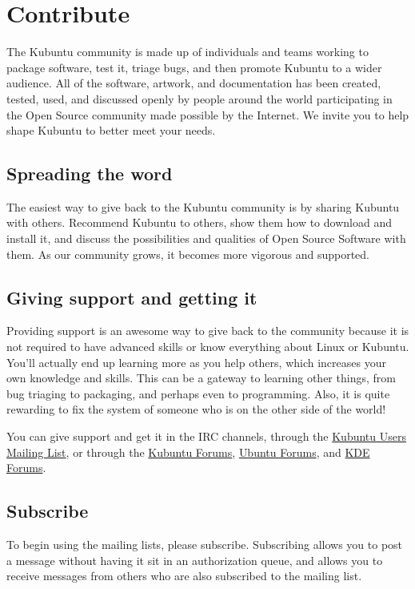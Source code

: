 \documentclass[letterpaper,10pt,english]{sphinxmanual}
\begin{document}
\chapter{Contribute}
\label{\detokenize{docs/contribute:contribute}}\label{\detokenize{docs/contribute::doc}}\label{\detokenize{docs/contribute:contribute-link}}
The Kubuntu community is made up of individuals and teams working to package software, test it, triage bugs, and then promote Kubuntu to a wider audience. All of the software, artwork, and documentation has been created, tested, used, and discussed openly by people around the world participating in the Open Source community made possible by the Internet. We invite you to help shape Kubuntu to better meet your needs.


\section{Spreading the word}
\label{\detokenize{docs/contribute:spreading-the-word}}
The easiest way to give back to the Kubuntu community is by sharing Kubuntu with others. Recommend Kubuntu to others, show them how to download and install it, and discuss the possibilities and qualities of Open Source Software with them. As our community grows, it becomes more vigorous and supported.


\section{Giving support and getting it}
\label{\detokenize{docs/contribute:giving-support-and-getting-it}}
Providing support is an awesome way to give back to the community because it is not required to have advanced skills or know everything about Linux or Kubuntu. You'll actually end up learning more as you help others, which increases your own knowledge and skills. This can be a gateway to learning other things, from bug triaging to packaging, and perhaps even to programming. Also, it is quite rewarding to fix the system of someone who is on the other side of the world!

You can give support and get it in the IRC channels, through the \href{https://lists.ubuntu.com/mailman/listinfo/kubuntu-users}{Kubuntu Users Mailing List}, or through the \href{https://www.kubuntuforums.net/content.php}{Kubuntu Forums}, \href{http://ubuntuforums.org/}{Ubuntu Forums}, and \href{https://forum.kde.org/}{KDE Forums}.


\section{Subscribe}
\label{\detokenize{docs/contribute:subscribe}}
To begin using the mailing lists, please subscribe. Subscribing allows you to post a message without having it sit in an authorization queue, and allows you to receive messages from others who are also subscribed to the mailing list.
\end{document}
